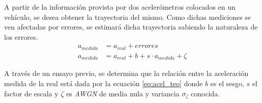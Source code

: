 
	A partir de la información provista por dos acelerómetros colocados en un vehículo, se desea obtener la trayectoria del mismo. Como dichas mediciones se ven afectadas por errores, se estimará dicha trayectoria sabiendo la naturaleza de los errores. 
	\begin{align}
		a_{medida} &= a_{real} + \mathit{errores} \\
		a_{medida} &= a_{real} + b + s \cdot a_{medida} + \zeta
		\label{eq:acel_teo}
	\end{align}

	A través de un ensayo previo, se determina que la relación entre la aceleración medida de la real está dada por la ecuación \eqref{eq:acel_teo} donde $b$ es el sesgo, $s$ el factor de escala y $\zeta$ es \emph{AWGN} de media nula y variancia $\sigma_\zeta$ conocida.

